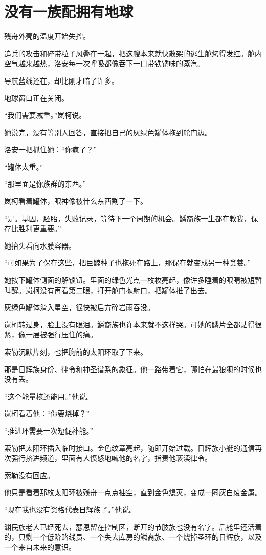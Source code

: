 \chapter{没有一族配拥有地球}

残舟外壳的温度开始失控。

追兵的攻击和碎带粒子风叠在一起，把这艘本来就快散架的逃生舱烤得发红。舱内空气越来越热，洛安每一次呼吸都像吞下一口带铁锈味的蒸汽。

导航蓝线还在，却比刚才暗了许多。

地球窗口正在关闭。

“我们需要减重。”岚柯说。

她说完，没有等别人回答，直接把自己的灰绿色罐体拖到舱门边。

洛安一把抓住她：“你疯了？”

“罐体太重。”

“那里面是你族群的东西。”

岚柯看着罐体，眼神像被什么东西割了一下。

“是。基因，胚胎，失败记录，等待下一个周期的机会。鳞裔族一生都在教我，保存比胜利更重要。”

她抬头看向水膜容器。

“可如果为了保存这些，把巨鲸种子也拖死在路上，那保存就变成另一种贪婪。”

她按下罐体侧面的解锁钮。里面的绿色光点一枚枚亮起，像许多睡着的眼睛被短暂叫醒。岚柯没有再看第二眼，打开舱门抛射口，把罐体推了出去。

灰绿色罐体滑入星空，很快被后方碎岩雨吞没。

岚柯转过身，脸上没有眼泪。鳞裔族也许本来就不这样哭。可她的鳞片全都贴得很紧，像一层被强行压住的痛。

索勒沉默片刻，也把胸前的太阳环取了下来。

那是日辉族身份、律令和神圣谱系的象征。他一路带着它，哪怕在最狼狈的时候也没有丢。

“这个能量核还能用。”他说。

岚柯看着他：“你要烧掉？”

“推进环需要一次短促补能。”

索勒把太阳环插入临时接口。金色纹章亮起，随即开始过载。日辉族小艇的通信再次强行挤进频道，里面有人愤怒地喊他的名字，指责他亵渎律令。

索勒没有回应。

他只是看着那枚太阳环被残舟一点点抽空，直到金色熄灭，变成一圈灰白废金属。

“现在我也没有资格代表日辉族了。”他说。

渊民族老人已经死去，瑟恩留在控制区，断开的节肢族也没有名字。后舱里还活着的，只剩一个低阶路线员、一个失去库房的鳞裔族、一个烧掉圣环的日辉族，以及一个来自未来的意识。

